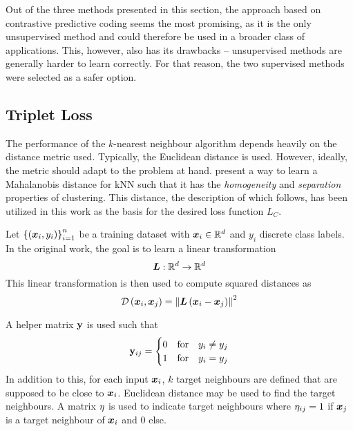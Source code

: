 Out of the three methods presented in this section, the approach based on contrastive predictive coding seems the most promising, as it is the only unsupervised method and could therefore be used in a broader class of applications. This, however, also has its drawbacks -- unsupervised methods are generally harder to learn correctly. For that reason, the two supervised methods were selected as a safer option.

\subsection{Triplet Loss}
The performance of the \( k \)-nearest neighbour algorithm depends heavily on the distance metric used. Typically, the Euclidean distance is used. However, ideally, the metric should adapt to the problem at hand. \cite{weinberger_distance_2006} present a way to learn a Mahalanobis distance for kNN such that it has the \textit{homogeneity} and \textit{separation} properties of clustering. This distance, the description of which follows, has been utilized in this work as the basis for the desired loss function \( L_C \).

Let \( \left\{ \left( \bm{x}_i, y_i \right) \right\}_{i = 1}^n \) be a training dataset with \( \bm{x}_i \in \mathbb{R}^d \) and \( y_i \) discrete class labels. In the original work, the goal is to learn a linear transformation
\[ \bm{L} : \mathbb{R}^d \to \mathbb{R}^d \]
This linear transformation is then used to compute squared distances as
\[ \mathcal{D} \left( \bm{x}_i, \bm{x}_j \right) = \left\lVert \bm{L} \left( \bm{x}_i - \bm{x}_j \right) \right\rVert^2 \]

A helper matrix \( \mathbf{y} \) is used such that
\[ \mathbf{y}_{ij} = \begin{cases}
	0 &\text{for} \quad y_i \neq y_j \\
	1 &\text{for} \quad y_i = y_j \\
\end{cases} \]
In addition to this, for each input \( \bm{x}_i \), \( k \) target neighbours are defined that are supposed to be close to \( \bm{x}_i \). Euclidean distance may be used to find the target neighbours. A matrix \( \mathbf{\eta} \) is used to indicate target neighbours where \( \mathbf{\eta}_{ij} = 1 \) if \( \bm{x}_j \) is a target neighbour of \( \bm{x}_i \) and \( 0 \) else.

